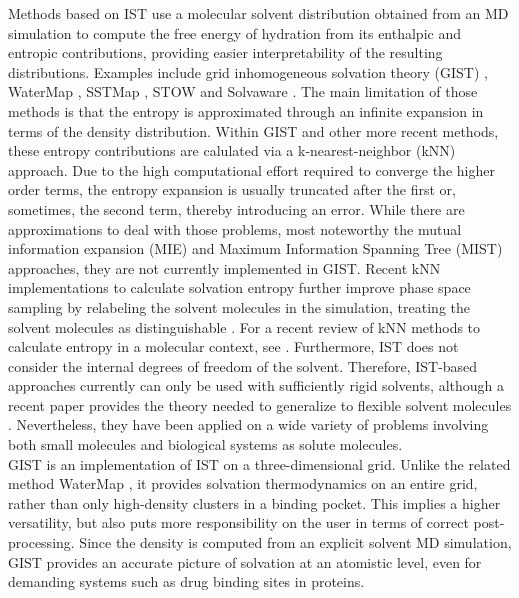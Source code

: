 \documentclass[9pt,tutorial]{livecoms}
\begin{document}
Methods based on IST use a molecular solvent distribution obtained from an MD simulation to compute the free energy of hydration from its enthalpic and entropic contributions, providing easier interpretability of the resulting distributions.
Examples include grid inhomogeneous solvation theory (GIST) \cite{Nguyen2012,Ramsey2016}, WaterMap \cite{Young2007-watermap,Abel2008-watermap}, SSTMap \cite{Haider2018-sstmap}, STOW \cite{Li2012-stow} and Solvaware \cite{Huggins2016-solvaware}.
The main limitation of those methods is that the entropy is approximated through an infinite expansion in terms of the density distribution. 
Within GIST and other more recent methods, these entropy contributions are calulated via a k-nearest-neighbor (kNN) approach.  
Due to the high computational effort required to converge the higher order terms, the entropy expansion is usually truncated after the first or, sometimes, the second \cite{Nguyen2016-gist-second-order,Waibl2022-gist-solvents} term, thereby introducing an error.
While there are approximations to deal with those problems, most noteworthy the mutual information expansion (MIE) and Maximum Information Spanning Tree (MIST) approaches, they are not currently implemented in GIST. 
Recent kNN implementations to calculate solvation entropy further improve phase space sampling by relabeling the solvent molecules in the simulation, treating the solvent molecules as distinguishable \cite{reinhard2007estimation,heinz2019computing,heinz2021permut,fogolari2021optimal}. For a recent review of kNN methods to calculate entropy in a molecular context, see \cite{fogolari2024k}.
Furthermore, IST does not consider the internal degrees of freedom of the solvent.
Therefore, IST-based approaches currently can only be used with sufficiently rigid solvents, although a recent paper provides the theory needed to generalize to flexible solvent molecules \cite{gilson2024freeenergy}.
Nevertheless, they have been applied on a wide variety of problems involving both small molecules and biological systems as solute molecules.\\
GIST is an implementation of IST on a three-dimensional grid. 
Unlike the related method WaterMap \cite{Abel2008-watermap,Young2007-watermap}, it provides solvation thermodynamics on an entire grid, rather than only high-density clusters in a binding pocket.
This implies a higher versatility, but also puts more responsibility on the user in terms of correct post-processing.
Since the density is computed from an explicit solvent MD simulation, GIST provides an accurate picture of solvation at an atomistic level, even for demanding systems such as drug binding sites in proteins.
\end{document}
